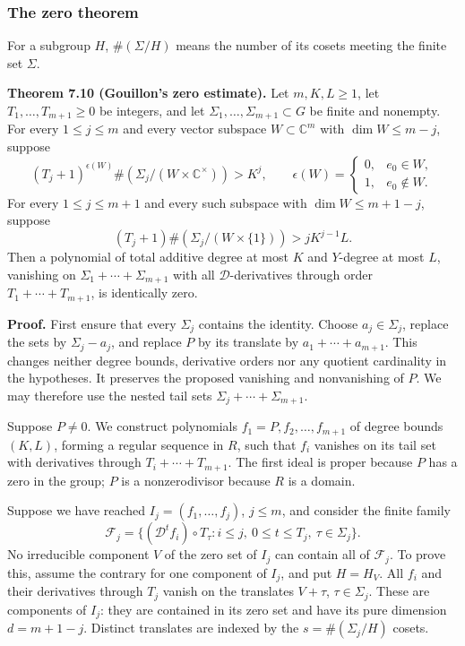 \documentclass[
  11pt,
  a4paper,
]{article}
\newcounter{none} %
\begin{document}
\subsubsection{The zero theorem}\label{the-zero-theorem}

For a subgroup \(H\), \(\#(\Sigma/H)\) means the number of its cosets
meeting the finite set \(\Sigma\).

\textbf{Theorem 7.10 (Gouillon's zero estimate).} Let \(m,K,L\ge1\), let
\(T_1,\ldots,T_{m+1}\ge0\) be integers, and let
\(\Sigma_1,\ldots,\Sigma_{m+1}\subset G\) be finite and nonempty. For
every \(1\le j\le m\) and every vector subspace \(W\subset\mathbb C^m\)
with \(\dim W\le m-j\), suppose \[
(T_j+1)^{\epsilon(W)}\#(\Sigma_j/(W\times\mathbb C^\times))>K^j,
\qquad
\epsilon(W)=\begin{cases}0,&e_0\in W,\\1,&e_0\notin W.\end{cases}
\] For every \(1\le j\le m+1\) and every such subspace with
\(\dim W\le m+1-j\), suppose \[
(T_j+1)\#(\Sigma_j/(W\times\{1\}))>jK^{j-1}L.
\] Then a polynomial of total additive degree at most \(K\) and
\(Y\)-degree at most \(L\), vanishing on
\(\Sigma_1+\cdots+\Sigma_{m+1}\) with all \(\mathcal D\)-derivatives
through order \(T_1+\cdots+T_{m+1}\), is identically zero.

\textbf{Proof.} First ensure that every \(\Sigma_j\) contains the
identity. Choose \(a_j\in\Sigma_j\), replace the sets by
\(\Sigma_j-a_j\), and replace \(P\) by its translate by
\(a_1+\cdots+a_{m+1}\). This changes neither degree bounds, derivative
orders nor any quotient cardinality in the hypotheses. It preserves the
proposed vanishing and nonvanishing of \(P\). We may therefore use the
nested tail sets \(\Sigma_j+\cdots+\Sigma_{m+1}\).

Suppose \(P\ne0\). We construct polynomials \(f_1=P,f_2,\ldots,f_{m+1}\)
of degree bounds \((K,L)\), forming a regular sequence in \(R\), such
that \(f_i\) vanishes on its tail set with derivatives through
\(T_i+\cdots+T_{m+1}\). The first ideal is proper because \(P\) has a
zero in the group; \(P\) is a nonzerodivisor because \(R\) is a domain.

Suppose we have reached \(I_j=(f_1,\ldots,f_j)\), \(j\le m\), and
consider the finite family \[
\mathcal F_j=\{(\mathcal D^t f_i)\circ T_\tau:
                  i\le j,\ 0\le t\le T_j,\ \tau\in\Sigma_j\}.
\] No irreducible component \(V\) of the zero set of \(I_j\) can contain
all of \(\mathcal F_j\). To prove this, assume the contrary for one
component of \(I_j\), and put \(H=H_V\). All \(f_i\) and their
derivatives through \(T_j\) vanish on the translates \(V+\tau\),
\(\tau\in\Sigma_j\). These are components of \(I_j\): they are contained
in its zero set and have its pure dimension \(d=m+1-j\). Distinct
translates are indexed by the \(s=\#(\Sigma_j/H)\) cosets.
\end{document}
